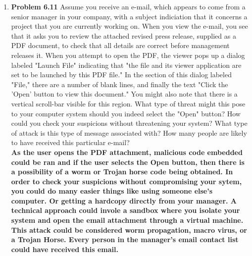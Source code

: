\documentclass[12pt]{article}
\begin{document}
\begin{enumerate}
\item \textbf{Problem 6.11} Assume you receive an e-mail, which appears to come from a senior manager in your company, with a subject indiciation that it concerns a project that you are currently working on. When you view the e-mail, you see that it asks you to review the attached revised press release, supplied as a PDF document, to check that all details are correct before management releases it. When you attempt to open the PDF, the viewer pops up a dialog labeled "Launch File" indicating that "the file and its viewer application are set to be launched by this PDF file." In the section of this dialog labeled "File," there are a number of blank lines, and finally the text "Click the 'Open' button to view this document." You might also note that there is a vertical scroll-bar visible for this region. What type of threat might this pose to your computer system should you indeed select the "Open" button? How could you check your suspicions without threatening your system? What type of attack is this type of message associated with? How many people are likely to have received this particular e-mail?  \\

\textbf{As the user opens the PDF attachment, malicious code embedded could be ran and if the user selects the Open button, then there is a possibility of a worm or Trojan horse code being obtained. In order to check your suspicions without compromising your sytem, you could do many easier things like using someone else's computer. Or getting a hardcopy directly from your manager. A technical approach could invole a sandbox where you isolate your system and open the email attachment through a virtual machine. This attack could be considered worm propagation, macro virus, or a Trojan Horse. Every person in the manager's email contact list could have received this email.} \\

\end{enumerate}
\end{document}
